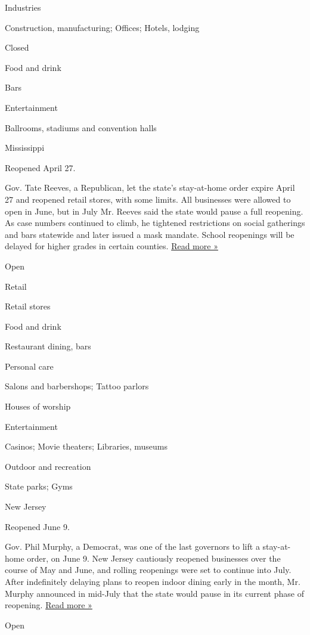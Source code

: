 Industries

Construction, manufacturing; Offices; Hotels, lodging

Closed

Food and drink

Bars

Entertainment

Ballrooms, stadiums and convention halls

Mississippi

Reopened April 27.

Gov. Tate Reeves, a Republican, let the state's stay-at-home order
expire April 27 and reopened retail stores, with some limits. All
businesses were allowed to open in June, but in July Mr. Reeves said the
state would pause a full reopening. As case numbers continued to climb,
he tightened restrictions on social gatherings and bars statewide and
later issued a mask mandate. School reopenings will be delayed for
higher grades in certain counties.
\href{https://www.wlox.com/2020/08/04/watch-gov-reeves-makes-announcement-schools/}{Read
more »}

Open

Retail

Retail stores

Food and drink

Restaurant dining, bars

Personal care

Salons and barbershops; Tattoo parlors

Houses of worship

Entertainment

Casinos; Movie theaters; Libraries, museums

Outdoor and recreation

State parks; Gyms

New Jersey

Reopened June 9.

Gov. Phil Murphy, a Democrat, was one of the last governors to lift a
stay-at-home order, on June 9. New Jersey cautiously reopened businesses
over the course of May and June, and rolling reopenings were set to
continue into July. After indefinitely delaying plans to reopen indoor
dining early in the month, Mr. Murphy announced in mid-July that the
state would pause in its current phase of reopening.
\href{https://www.nj.com/coronavirus/2020/07/murphy-hitting-pause-on-reopening-as-coronavirus-rate-of-transmission-rises.html}{Read
more »}

Open

